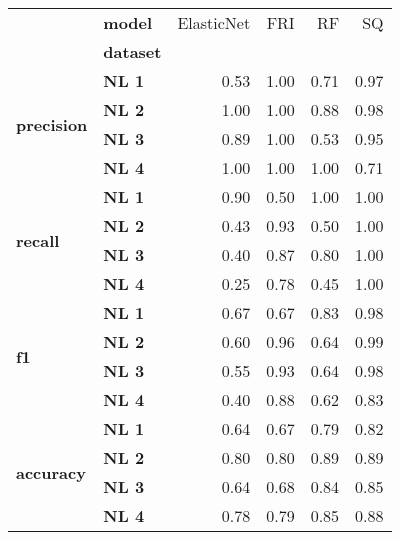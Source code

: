 \begin{tabular}{llrrrr}
\toprule
         & \textbf{model} &  ElasticNet &  FRI &   RF &   SQ \\
{} & \textbf{dataset} &             &      &      &      \\
\midrule
\multirow{4}{*}{\textbf{precision}} & \textbf{NL 1} &        0.53 & 1.00 & 0.71 & 0.97 \\
         & \textbf{NL 2} &        1.00 & 1.00 & 0.88 & 0.98 \\
         & \textbf{NL 3} &        0.89 & 1.00 & 0.53 & 0.95 \\
         & \textbf{NL 4} &        1.00 & 1.00 & 1.00 & 0.71 \\
\cline{1-6}
\multirow{4}{*}{\textbf{recall}} & \textbf{NL 1} &        0.90 & 0.50 & 1.00 & 1.00 \\
         & \textbf{NL 2} &        0.43 & 0.93 & 0.50 & 1.00 \\
         & \textbf{NL 3} &        0.40 & 0.87 & 0.80 & 1.00 \\
         & \textbf{NL 4} &        0.25 & 0.78 & 0.45 & 1.00 \\
\cline{1-6}
\multirow{4}{*}{\textbf{f1}} & \textbf{NL 1} &        0.67 & 0.67 & 0.83 & 0.98 \\
         & \textbf{NL 2} &        0.60 & 0.96 & 0.64 & 0.99 \\
         & \textbf{NL 3} &        0.55 & 0.93 & 0.64 & 0.98 \\
         & \textbf{NL 4} &        0.40 & 0.88 & 0.62 & 0.83 \\
\cline{1-6}
\multirow{4}{*}{\textbf{accuracy}} & \textbf{NL 1} &        0.64 & 0.67 & 0.79 & 0.82 \\
         & \textbf{NL 2} &        0.80 & 0.80 & 0.89 & 0.89 \\
         & \textbf{NL 3} &        0.64 & 0.68 & 0.84 & 0.85 \\
         & \textbf{NL 4} &        0.78 & 0.79 & 0.85 & 0.88 \\
\bottomrule
\end{tabular}
